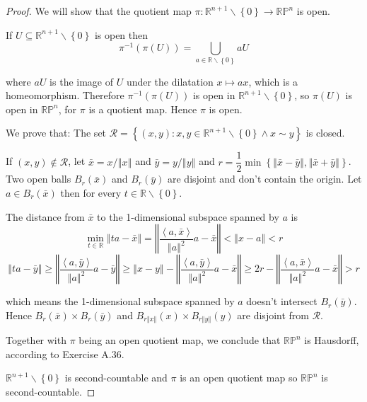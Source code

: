 \begin{proof}
    We will show that the quotient map \( \pi: \mathbb{R}^{n+1}\smallsetminus\left\{0\right\} \to \mathbb{RP}^{n} \) is open.

    If \( U \subseteq \mathbb{R}^{n+1}\smallsetminus\left\{0\right\} \) is open then
    \[
        \pi^{-1}(\pi(U)) = \bigcup_{a \in \mathbb{R} \smallsetminus \left\{ 0 \right\}} a U
    \]

    where \( a U \) is the image of \( U \) under the dilatation \( x \mapsto a x \), which is a homeomorphism. Therefore \( \pi^{-1}(\pi(U)) \) is open in \( \mathbb{R}^{n+1} \smallsetminus \left\{ 0 \right\} \), so \( \pi(U) \) is open in \( \mathbb{RP}^{n} \), for \( \pi \) is a quotient map. Hence \( \pi \) is open.

    We prove that: The set \( \mathcal{R} = \left\{ (x, y) : x, y \in \mathbb{R}^{n+1}\smallsetminus\left\{0\right\} \land x \sim y \right\} \) is closed.

    If \( (x, y) \notin \mathcal{R} \), let \( \bar{x} = x/\left\Vert x \right\Vert \) and \( \bar{y} = y/\left\Vert y \right\Vert \) and \( r = \dfrac{1}{2} \min \left\{ \left\Vert  \bar{x} - \bar{y} \right\Vert, \left\Vert \bar{x} + \bar{y} \right\Vert \right\} \). Two open balls \( B_{r}(\bar{x}) \) and \( B_{r}(\bar{y}) \) are disjoint and don't contain the origin. Let \( a \in B_{r}(\bar{x}) \) then for every \( t \in \mathbb{R} \smallsetminus \left\{ 0 \right\} \).

    The distance from \( \bar{x} \) to the 1-dimensional subspace spanned by \( a \) is
    \[
        \min\limits_{t \in \mathbb{R}} \left\Vert ta - \bar{x} \right\Vert = \left\Vert \dfrac{\left\langle a, \bar{x} \right\rangle}{{\left\Vert a \right\Vert}^{2}}a - \bar{x} \right\Vert < \left\Vert x - a \right\Vert < r
    \]
    \[
        \left\Vert ta - \bar{y} \right\Vert \ge \left\Vert \dfrac{\left\langle a, \bar{y} \right\rangle}{{\left\Vert a\right\Vert}^{2}}a - \bar{y} \right\Vert \ge \left\Vert x - y \right\Vert - \left\Vert \dfrac{\left\langle a, \bar{y} \right\rangle}{{\left\Vert a\right\Vert}^{2}}a - \bar{x} \right\Vert \ge 2r - \left\Vert \dfrac{\left\langle a, \bar{x} \right\rangle}{{\left\Vert a \right\Vert}^{2}}a - \bar{x} \right\Vert > r
    \]

    which means the 1-dimensional subspace spanned by \( a \) doesn't intersect \( B_{r}(\bar{y}) \). Hence \( B_{r}(\bar{x}) \times B_{r}(\bar{y}) \) and \( B_{r\left\Vert x \right\Vert}(x) \times B_{r\left\Vert y \right\Vert}(y) \) are disjoint from \( \mathcal{R} \).

    Together with \( \pi \) being an open quotient map, we conclude that \( \mathbb{RP}^{n} \) is Hausdorff, according to Exercise A.36.

    \( \mathbb{R}^{n+1} \smallsetminus \left\{ 0 \right\} \) is second-countable and \( \pi \) is an open quotient map so \( \mathbb{RP}^{n} \) is second-countable.
\end{proof}

